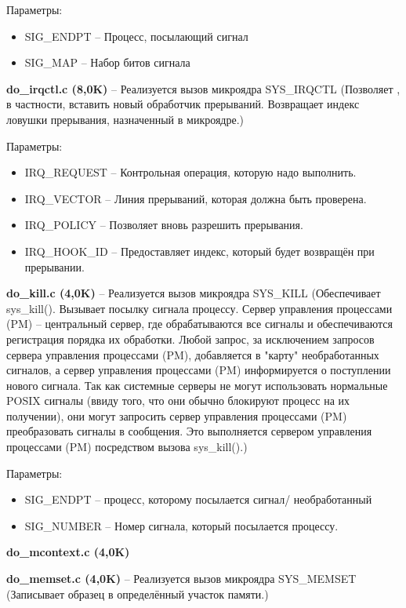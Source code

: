 Параметры:
\begin{itemize}
\item SIG\_ENDPT -- Процесс, посылающий сигнал
\item SIG\_MAP -- Набор битов сигнала
\end{itemize}

\textbf{do\_irqctl.c (8,0K)} -- Реализуется вызов микроядра SYS\_IRQCTL (Позволяет , в частности, вставить новый обработчик прерываний. Возвращает индекс ловушки прерывания, назначенный в микроядре.)

Параметры:
\begin{itemize}
\item IRQ\_REQUEST -- Контрольная операция, которую надо выполнить.
\item IRQ\_VECTOR -- Линия прерываний, которая должна быть проверена.
\item IRQ\_POLICY -- Позволяет вновь разрешить прерывания.
\item IRQ\_HOOK\_ID -- Предоставляет индекс, который будет возвращён при прерывании.
\end{itemize}

\textbf{do\_kill.c (4,0K)} -- Реализуется вызов микроядра SYS\_KILL (Обеспечивает sys\_kill(). Вызывает посылку сигнала процессу. Сервер управления процессами (PM) – центральный сервер, где обрабатываются все сигналы и обеспечиваются регистрация порядка их обработки. Любой запрос, за исключением запросов сервера управления процессами (PM), добавляется в "карту" необработанных сигналов, а сервер управления процессами (PM) информируется о поступлении нового сигнала. Так как системные серверы не могут использовать нормальные POSIX сигналы (ввиду того, что они обычно блокируют процесс на их получении), они могут запросить сервер управления
процессами (PM) преобразовать сигналы в сообщения. Это выполняется сервером управления процессами (PM) посредством вызова sys\_kill().)

Параметры:
\begin{itemize}
\item SIG\_ENDPT -- процесс, которому посылается сигнал/ необработанный
\item SIG\_NUMBER -- Номер сигнала, который посылается процессу.
\end{itemize}

\textbf{do\_mcontext.c (4,0K)}

\textbf{do\_memset.c (4,0K)} -- Реализуется вызов микроядра SYS\_MEMSET (Записывает образец в определённый участок памяти.)

